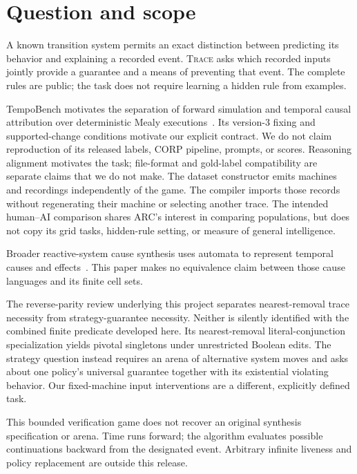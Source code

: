 \documentclass[11pt]{article}
\newcommand{\TRACE}{\textsc{Trace}}
\begin{document}
\section{Question and scope}
A known transition system permits an exact distinction between predicting its
behavior and explaining a recorded event. \TRACE{} asks which recorded inputs
jointly provide a guarantee and a means of preventing that event. The complete
rules are public; the task does not require learning a hidden rule from examples.

TempoBench motivates the separation of forward simulation and temporal causal
attribution over deterministic Mealy executions~\cite{holzer2026tempobenchv3}.
Its version-3 fixing and supported-change conditions motivate our explicit
contract. We do not claim reproduction of its released labels, CORP pipeline,
prompts, or scores. Reasoning alignment motivates the task; file-format and
gold-label compatibility are separate claims that we do not make. The dataset
constructor emits machines and recordings independently of the game. The compiler
imports those records without regenerating their machine or selecting another trace.
The intended human--AI comparison shares ARC's interest in comparing populations,
but does not copy its grid tasks, hidden-rule setting, or measure of general
intelligence.

Broader reactive-system cause synthesis uses automata to represent temporal
causes and effects~\cite{finkbeiner2024corp}. This paper makes no equivalence
claim between those cause languages and its finite cell sets.

The reverse-parity review underlying this project separates nearest-removal
trace necessity from strategy-guarantee necessity. Neither is silently
identified with the combined finite predicate developed here. Its
nearest-removal literal-conjunction specialization yields pivotal singletons
under unrestricted Boolean edits. The strategy question instead requires an
arena of alternative system moves and asks about one policy's universal guarantee
together with its existential violating behavior. Our fixed-machine input
interventions are a different, explicitly defined task.

This bounded verification game does not recover an original synthesis
specification or arena. Time runs forward; the algorithm evaluates possible
continuations backward from the designated event. Arbitrary infinite liveness
and policy replacement are outside this release.
\end{document}
